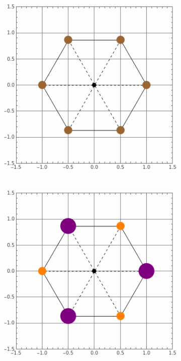 \documentclass[../main.tex]{subfiles}
\begin{document}
\newpage

\begin{figure}[ht!]
    \centering
    \begin{subfigure}[c]{0.45\textwidth}
        \centering
        \includegraphics[width=\textwidth]{../imgs/img1a.png}
        \caption{~}\label{fig:1a}
    \end{subfigure}
    \begin{subfigure}[c]{0.45\textwidth}
        \centering
        \includegraphics[width=\textwidth]{../imgs/img1b.png}
        \caption{~}\label{fig:1b}
    \end{subfigure}


\end{figure}
\end{document}
